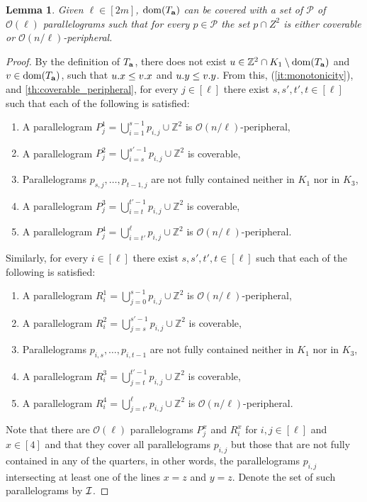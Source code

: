 \documentclass[11pt, letterpaper]{article}
\theoremstyle{plain}
\newtheorem{lemma}{Lemma}
\theoremstyle{definition}
\theoremstyle{remark}
\newcommand{\Z}{\mathbb{Z}}
\renewcommand{\O}{\mathcal{O}}
\begin{document}
\begin{lemma}\label{lm:parallelogram_merge}
Given $\ell \in [2m]$, $\operatorname*{dom}(T_\mathbf{a})$ can be covered with a set of $\mathcal{P}$ of $\O(\ell)$ parallelograms such that for every $p \in \mathcal{P}$ the set $p \cap Z^2$ is either coverable or $\O(n / \ell)$-peripheral. 
\end{lemma}
\begin{proof}
By the definition of $T_\mathbf{a}$, there does not exist $u \in \Z^2 \cap K_1 \setminus \d{\Ta}$ and $v \in \operatorname*{dom}(T_\mathbf{a})$, such that $u.x \le v.x$ and $u.y \le v.y$. From this, (\ref{it:monotonicity}), and \ref{th:coverable_peripheral}, for every $j \in [\ell]$ there exist $s,s', t',t \in [\ell]$  such that each of the following is satisfied:
\begin{enumerate}
	\item A parallelogram $P_j^1 = \bigcup_{i=1}^{s-1} p_{i, j} \cup \Z^2$ is $\O(n/\ell)$-peripheral,
	\item A parallelogram $P_j^2 = \bigcup_{i=s}^{s'-1} p_{i, j} \cup \Z^2$ is coverable, 
	\item Parallelograms $p_{s, j}, \dots, p_{t - 1, j}$ are not fully contained neither in $K_1$ nor in $K_3$,
	\item A parallelogram $P_j^3 = \bigcup_{i=t}^{t'-1} p_{i, j} \cup \Z^2$ is coverable,
	\item A parallelogram $P_j^4 = \bigcup_{i=t'}^{\ell} p_{i, j} \cup \Z^2$ is $\O(n/\ell)$-peripheral.
\end{enumerate}

\noindent Similarly, for every $i \in [\ell]$ there exist $s,s', t',t \in [\ell]$  such that each of the following is satisfied:
\begin{enumerate}
	\item A parallelogram $R_i^1 = \bigcup_{j=0}^{s-1} p_{i, j} \cup \Z^2$ is $\O(n/\ell)$-peripheral,
	\item A parallelogram $R_i^2 = \bigcup_{j=s}^{s'-1} p_{i, j} \cup \Z^2$ is coverable, 
	\item Parallelograms $p_{i, s}, \dots, p_{i, t-1}$ are not fully contained neither in $K_1$ nor in $K_3$,
	\item A parallelogram $R_i^3 = \bigcup_{j=t}^{t'-1} p_{i, j} \cup \Z^2$ is coverable,
	\item A parallelogram $R_i^4 = \bigcup_{j=t'}^{\ell} p_{i, j} \cup \Z^2$ is $\O(n/\ell)$-peripheral. 
\end{enumerate}

Note that there are $\O(\ell)$ parallelograms $P_j^x$ and $R_i^x$ for $i,j \in [\ell]$ and $x \in [4]$ and that they cover all parallelograms $p_{i,j}$ but those that are not fully contained in any of the quarters, in other words, the parallelograms $p_{i, j}$ intersecting  at least one of the lines $x = z$ and $y = z$. Denote the set of such parallelograms by $\mathcal{I}$. 


\end{proof}
\end{document}
